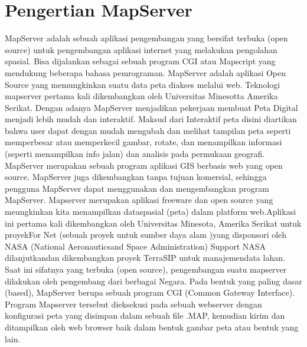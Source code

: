 \section{ Pengertian MapServer}

MapServer adalah sebuah aplikasi pengembangan yang bersifat terbuka (open source) untuk pengembangan aplikasi internet yang melakukan pengolahan spasial. Bisa dijalankan sebagai sebuah program CGI atau Mapscript yang mendukung beberapa bahasa pemrograman.
MapServer adalah aplikasi Open Source yang memungkinkan suatu data peta diakses melalui web. Teknologi mapserver pertama kali dikembangkan oleh Universitas Minesotta Amerika Serikat. Dengan adanya MapServer menjadikan pekerjaan membuat Peta Digital menjadi lebih mudah dan interaktif. Maksud dari Interaktif peta disini diartikan bahwa user dapat dengan mudah mengubah dan melihat tampilan peta seperti memperbesar atau memperkecil gambar, rotate, dan menampilkan informasi (seperti menampilkan info jalan) dan analisis pada permukaan geografi. 
MapServer merupakan sebuah program aplikasi GIS berbasis web yang open source. MapServer juga dikembangkan tanpa tujuan komersial, sehingga pengguna MapServer dapat menggunakan dan mengembangkan program MapServer. 
Mapserver merupakan aplikasi freeware dan open source yang meungkinkan kita menampilkan dataspasial (peta) dalam platform web.Aplikasi ini pertama kali dikembangkan oleh Universitas Minesota, Amerika Serikat untuk proyekFor Net (sebuah proyek untuk sumber daya alam )yang disponsori oleh NASA (National Aeronauticsand Space Administration) Support NASA dilanjutkandan dikembangkan proyek TerraSIP  untuk manajemendata lahan. Saat ini sifatnya yang terbuka (open source), pengembangan suatu mapserver dilakukan oleh pengembang dari berbagai Negara. 
Pada bentuk yang paling dasar (based), MapServer berupa sebuah  program CGI (Common Gateway Interface). Program Mapserver tersebut dieksekusi pada sebuah webserver dengan konfigurasi peta yang disimpan dalam sebuah file \*.MAP, kemudian kirim dan ditampilkan oleh web browser baik dalam bentuk gambar peta atau  bentuk yang lain. 

